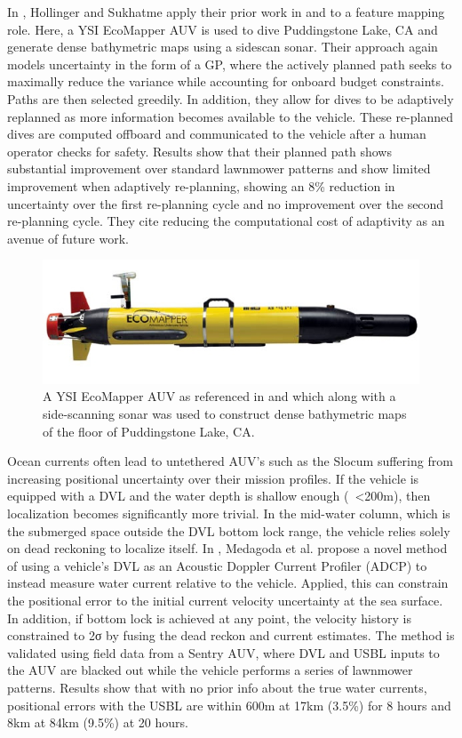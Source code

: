 \documentclass[double,12pt]{beavtex}
\newcommand{\greek}[1]{{\selectlanguage{polutonikogreek}#1}}
\begin{document}
In \cite{geoffmapping}, Hollinger and Sukhatme apply their prior work in \cite{geoffadapt} and \cite{geoffuncertainty} to a feature mapping role. Here, a YSI EcoMapper AUV is used to dive Puddingstone Lake, CA and generate dense bathymetric maps using a sidescan sonar. Their approach again models uncertainty in the form of a GP, where the actively planned path seeks to maximally reduce the variance while accounting for onboard budget constraints. Paths are then selected greedily. In addition, they allow for dives to be adaptively replanned as more information becomes available to the vehicle. These re-planned dives are computed offboard and communicated to the vehicle after a human operator checks for safety. Results show that their planned path shows substantial improvement over standard lawnmower patterns and show limited improvement when adaptively re-planning, showing an 8\% reduction in uncertainty over the first re-planning cycle and no improvement over the second re-planning cycle. They cite reducing the computational cost of adaptivity as an avenue of future work.

\begin{figure}[h!]
\begin{center}
\includegraphics[width=0.5\columnwidth]{eco}
\caption{A YSI EcoMapper AUV as referenced in \cite{smithfront} and \cite{geoffmapping} which along with a side-scanning sonar was used to construct dense bathymetric maps of the floor of Puddingstone Lake, CA.}
\label{fig:eco}
\end{center}
\end{figure}

Ocean currents often lead to untethered AUV's such as the Slocum suffering from increasing positional uncertainty over their mission profiles. If the vehicle is equipped with a DVL and the water depth is shallow enough (~<200m), then localization becomes significantly more trivial. In the mid-water column, which is the submerged space outside the DVL bottom lock range, the vehicle relies solely on dead reckoning to localize itself. In \cite{medagoda}, Medagoda et al. propose a novel method of using a vehicle's DVL as an Acoustic Doppler Current Profiler (ADCP) to instead measure water current relative to the vehicle. Applied, this can constrain the positional error to the initial current velocity uncertainty at the sea surface. In addition, if bottom lock is achieved at any point, the velocity history is constrained to 2\greek{σ} by fusing the dead reckon and current estimates. The method is validated using field data from a Sentry AUV, where DVL and USBL inputs to the AUV are blacked out while the vehicle performs a series of lawnmower patterns. Results show that with no prior info about the true water currents, positional errors with the USBL are within 600m at 17km (3.5\%) for 8 hours and 8km at 84km (9.5\%) at 20 hours. 
\end{document}
